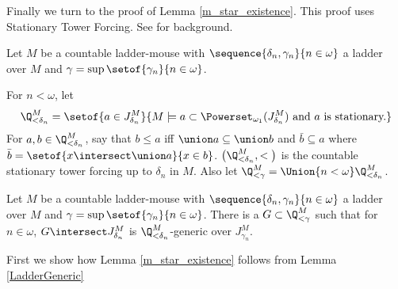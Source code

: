 \documentclass[oneside,12pt]{amsart}
\begin{document}
Finally we turn to the proof of Lemma \ref{m_star_existence}. This proof uses
Stationary Tower Forcing. See \cite{Larson_Book} for background.

Let $M$ be a countable ladder-mouse
with $\sequence{\delta_n,\gamma_n}{n\in\omega}$ a ladder over $M$ and
$\gamma=\sup\setof{\gamma_n}{n\in\omega}$.

For $n<\omega$, let
$$\Q_{<\delta_n}^M=\setof{a\in J^M_{\delta_n}}{M\models a\subset \Powerset_{\omega_1}(J^M_{\delta_n}) \text{ and } a \text{ is stationary.}}$$
For $a,b\in \Q_{<\delta_n}^M$, say that $b\leq a$ iff $\union a \subseteq \union b$ and $\bar{b} \subseteq a$ where $\bar{b}=\setof{x\intersect\union a}{x\in b}$.
$\big(\Q_{<\delta_n}^M, <\big)$ is the countable stationary tower forcing up to $\delta_n$ in $M$. Also let $\Q_{<\gamma}^M=\Union{n<\omega}\Q_{<\delta_n}^M$.

\begin{lemma}
\label{LadderGeneric}
Let $M$ be a countable ladder-mouse
with $\sequence{\delta_n,\gamma_n}{n\in\omega}$ a ladder over $M$ and
$\gamma=\sup\setof{\gamma_n}{n\in\omega}$.
There is a $G\subset \Q_{<\gamma}^M$ such that for $n\in\omega$, $G\intersect J^M_{\delta_n}$ is $\Q_{<\delta_n}^M$-generic over $J^M_{\gamma_n}$.
\end{lemma}

First we show how Lemma \ref{m_star_existence} follows from Lemma
\ref{LadderGeneric}
\end{document}
